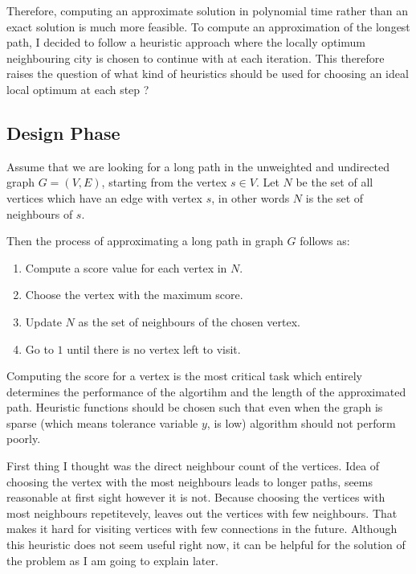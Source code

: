 \documentclass[12pt]{report}
\begin{document}
            Therefore, computing an approximate solution in polynomial time rather than an exact solution is much more feasible. To compute an approximation of the
            longest path, I decided to follow a heuristic approach where the locally optimum neighbouring city is chosen to continue with at each iteration. This therefore
            raises the question of what kind of heuristics should be used for choosing an ideal local optimum at each step ?

        \subsection{Design Phase}
            
            Assume that we are looking for a long path in the unweighted and undirected graph $G=(V,E)$, starting from the vertex $s \in V$. Let $N$ be the set of all vertices
            which have an edge with vertex $s$, in other words $N$ is the set of neighbours of $s$. 
            \newline

            Then the process of approximating a long path in graph $G$ follows as:

            \begin{enumerate}
                \item Compute a score value for each vertex in $N$.
                \item Choose the vertex with the maximum score.
                \item Update $N$ as the set of neighbours of the chosen vertex.
                \item Go to $1$ until there is no vertex left to visit.
            \end{enumerate}

            Computing the score for a vertex is the most critical task which entirely determines the performance of the algortihm and the length of the approximated path. 
            Heuristic functions should be chosen such that even when the graph is sparse (which means tolerance variable $y$, is low) algorithm should not perform poorly. 
            \newline

            First thing I thought was the direct neighbour count of the vertices. Idea of choosing the vertex with the most neighbours leads to longer paths, seems reasonable at 
            first sight however it is not. Because choosing the vertices with most neighbours repetitevely, leaves out the vertices with few neighbours. That makes it hard for visiting
            vertices with few connections in the future. Although this heuristic does not seem useful right now, it can be helpful for the solution of the problem as I am going to 
            explain later.
\end{document}
